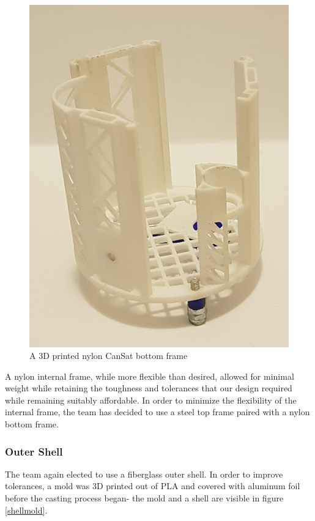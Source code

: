 \documentclass[]{report}
\begin{document}
		\begin{figure}[h]
			\hfill\includegraphics[scale=0.15]{nylon_frame.jpg}\hspace*{\fill}
			\caption{A 3D printed nylon CanSat bottom frame}
			\label{nylonframe}
		\end{figure}
		
		A nylon internal frame, while more flexible than desired, allowed for minimal weight while retaining the toughness and tolerances that our design required while remaining suitably affordable. In order to minimize the flexibility of the internal frame, the team has decided to use a steel top frame paired with a nylon bottom frame.
		
		\subsubsection{Outer Shell}
		
		The team again elected to use a fiberglass outer shell. In order to improve tolerances, a mold was 3D printed out of PLA and covered with aluminum foil before the casting process began- the mold and a shell are visible in figure \ref{shellmold}.
		
\end{document}

